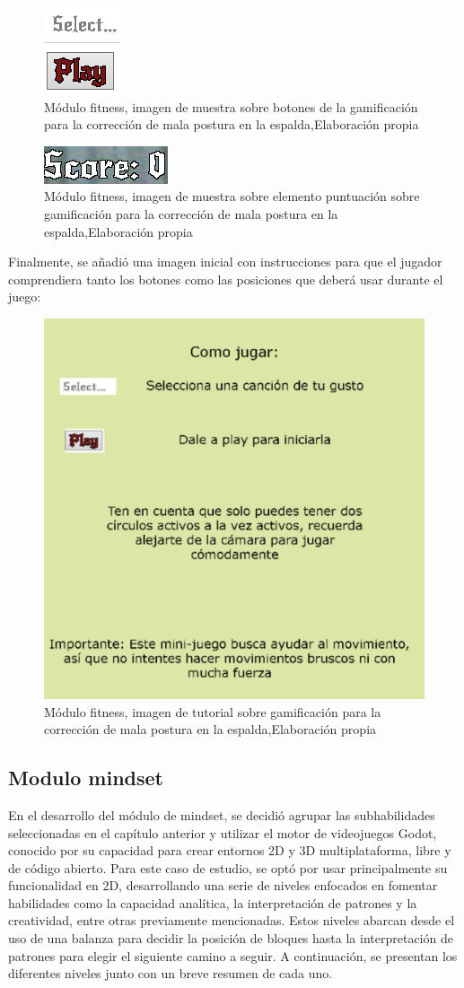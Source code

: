 \begin{figure}[H]
  \centering
  \includegraphics[width=0.1\linewidth]{Imagenes/Fitness4.png}
  \caption{Módulo fitness, imagen de muestra sobre botones de la gamificación para la corrección de mala postura en la espalda,Elaboración propia}
  \label{fig:imagen5fitness}
\end{figure}

\begin{figure}[H]
  \centering
  \includegraphics[width=0.2\linewidth]{Imagenes/Fitness5.png}
  \caption{Módulo fitness, imagen de muestra sobre elemento puntuación sobre gamificación para la corrección de mala postura en la espalda,Elaboración propia}
  \label{fig:imagen6fitness}
\end{figure}

Finalmente, se añadió una imagen inicial con instrucciones para que el jugador comprendiera tanto los botones como las posiciones que deberá usar durante el juego:
\begin{figure}[H]
  \centering
  \includegraphics[width=0.5\linewidth]{Imagenes/tuto-espalda.png}
  \caption{Módulo fitness, imagen de tutorial sobre gamificación para la corrección de mala postura en la espalda,Elaboración propia}
  \label{fig:imagen7fitness}
\end{figure}

\subsection{Modulo mindset}
En el desarrollo del módulo de mindset, se decidió agrupar las subhabilidades seleccionadas en el capítulo anterior y utilizar el motor de videojuegos Godot, conocido por su capacidad para crear entornos 2D y 3D multiplataforma, libre y de código abierto. Para este caso de estudio, se optó por usar principalmente su funcionalidad en 2D, desarrollando una serie de niveles enfocados en fomentar habilidades como la capacidad analítica, la interpretación de patrones y la creatividad, entre otras previamente mencionadas. Estos niveles abarcan desde el uso de una balanza para decidir la posición de bloques hasta la interpretación de patrones para elegir el siguiente camino a seguir. A continuación, se presentan los diferentes niveles junto con un breve resumen de cada uno.
